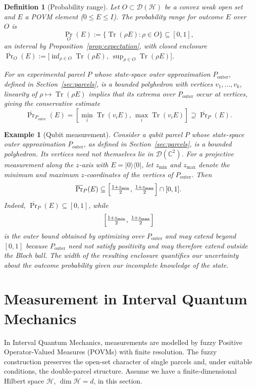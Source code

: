 \documentclass[11pt, onecolumn]{article}
\newtheorem{definition}{Definition}
\newtheorem{example}{Example}
\begin{document}
\begin{definition}[Probability range]
\label{def:probability}
Let \(O\subset\mathcal{D}(\mathcal{H})\) be a convex weak open set and \(E\) a POVM element (\(0\le E\le I\)). The \emph{probability range} for outcome \(E\) over \(O\) is
\[
\Pr_O(E) := \{\operatorname{Tr}(\rho E) : \rho\in O\}\subseteq[0,1],
\]
an interval by Proposition~\ref{prop:expectation}, with closed enclosure $\overline{\Pr}_O(E) := \bigl[\inf_{\rho\in O}\operatorname{Tr}(\rho E),\ \sup_{\rho\in O}\operatorname{Tr}(\rho E)\bigr]$.

For an experimental parcel $P$ whose state-space outer approximation
$P_{\mathrm{outer}}$, defined in Section~\ref{sec:parcels}, is a bounded
polyhedron with vertices $v_1,\ldots,v_k$, linearity of
$\rho\mapsto\operatorname{Tr}(\rho E)$ implies that its extrema over
$P_{\mathrm{outer}}$ occur at vertices, giving the conservative estimate
\[
\overline{\Pr}_{P_{\mathrm{outer}}}(E)
=
\left[
\min_i\operatorname{Tr}(v_iE),\,
\max_i\operatorname{Tr}(v_iE)
\right]
\supseteq
\overline{\Pr}_P(E).
\]
\end{definition}
\begin{example}[Qubit measurement]
\label{ex:qubit}
Consider a qubit parcel $P$ whose state-space outer approximation
$P_{\mathrm{outer}}$, as defined in Section~\ref{sec:parcels}, is a
bounded polyhedron. Its vertices need not themselves lie in
$\mathcal D(\mathbb C^2)$. For a projective measurement along the
$z$-axis with $E=|0\rangle\langle0|$, let $z_{\min}$ and $z_{\max}$
denote the minimum and maximum $z$-coordinates of the vertices of
$P_{\mathrm{outer}}$. Then
\[
\overline{\Pr}_P(E)
\subseteq
\Bigl[
\tfrac{1+z_{\min}}2,\,
\tfrac{1+z_{\max}}2
\Bigr]\cap[0,1].
\]
Indeed, $\overline{\Pr}_P(E)\subseteq[0,1]$, while
\[
\Bigl[
\tfrac{1+z_{\min}}2,\,
\tfrac{1+z_{\max}}2
\Bigr]
\]
is the outer bound obtained by optimizing over
$P_{\mathrm{outer}}$ and may extend beyond $[0,1]$ because
$P_{\mathrm{outer}}$ need not satisfy positivity and may therefore
extend outside the Bloch ball. The width of the resulting enclosure
quantifies our uncertainty about the outcome probability given our
incomplete knowledge of the state.
\end{example}

\section{Measurement in Interval Quantum Mechanics}\label{sec:measurement}

In Interval Quantum Mechanics, measurements are modelled by fuzzy Positive Operator-Valued Measures (POVMs) with finite resolution. The fuzzy construction preserves the open-set character of single parcels and, under suitable conditions, the double-parcel structure. Assume we have a finite-dimensional Hilbert space $\mathcal H$, $\dim\mathcal H=d$, in this section.
\end{document}
